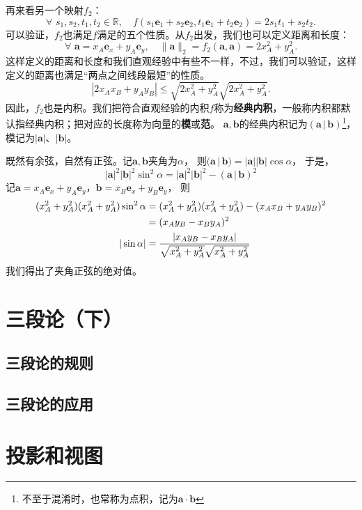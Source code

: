 \documentclass[12pt,UTF8]{ctexbook}
\begin{document}
再来看另一个映射$f_2$：
$$ \forall \,\, s_1, s_2, t_1, t_2 \in \mathbb{R}, \quad f(s_1\mathbf{e}_1 + s_2\mathbf{e}_2, t_1\mathbf{e}_1 + t_2\mathbf{e}_2) = 2s_1t_1 + s_2 t_2.$$
可以验证，$f_2$也满足$f$满足的五个性质。从$f_2$出发，我们也可以定义距离和长度：
$$ \forall \,\, \mathbf{a} = x_A\mathbf{e}_x + y_A\mathbf{e}_y, \quad \| \mathbf{a} \|_2 = f_2(\mathbf{a}, \mathbf{a}) = 2x_A^2 + y_A^2. $$
这样定义的距离和长度和我们直观经验中有些不一样，不过，我们可以验证，这样定义的距离也满足“两点之间线段最短”的性质。
$$ |2x_Ax_B + y_Ay_B| \leqslant \sqrt{2x_A^2 + y_A^2} \sqrt{2x_A^2 + y_A^2}.$$
因此，$f_2$也是内积。我们把符合直观经验的内积$f$称为\textbf{经典内积}，一般称内积都默认指经典内积；把对应的长度称为向量的\textbf{模}或\textbf{范}。
$\mathbf{a}, \mathbf{b}$的经典内积记为$(\mathbf{a}\, | \, \mathbf{b})$\footnote{不至于混淆时，也常称为点积，记为$\mathbf{a} \cdot \mathbf{b}$}，模记为$|\mathbf{a}|$、$|\mathbf{b}|$。

既然有余弦，自然有正弦。记$\mathbf{a}, \mathbf{b}$夹角为$\alpha$，
则$(\mathbf{a}\, | \, \mathbf{b}) = |\mathbf{a}||\mathbf{b}| \cos \alpha$，
于是，
$$ |\mathbf{a}|^2|\mathbf{b}|^2 \sin^2 \alpha = |\mathbf{a}|^2|\mathbf{b}|^2 - (\mathbf{a}\, | \, \mathbf{b})^2 $$
记$\mathbf{a} = x_A\mathbf{e}_x + y_A\mathbf{e}_y$，$\mathbf{b} = x_B\mathbf{e}_x + y_B\mathbf{e}_y$，
则
\begin{align}
    (x_A^2 + y_A^2)(x_A^2 + y_A^2) \sin^2 \alpha &= (x_A^2 + y_A^2)(x_A^2 + y_A^2) - (x_Ax_B + y_Ay_B)^2 \notag \\
    &= (x_Ay_B - x_By_A)^2 \notag \\
    |\sin \alpha| &= \frac{|x_Ay_B - x_By_A|}{\sqrt{x_A^2 + y_A^2} \sqrt{x_A^2 + y_A^2}} \notag
\end{align}
我们得出了夹角正弦的绝对值。


\chapter{三段论（下）}
\section{三段论的规则}
\section{三段论的应用}

\chapter{投影和视图}
\end{document}
